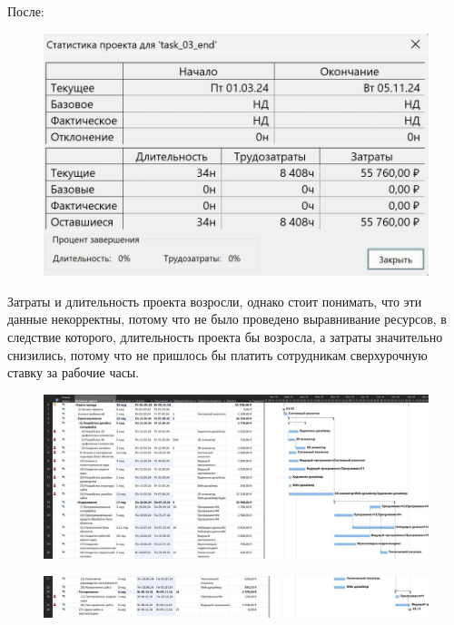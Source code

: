 После:

\begin{figure}[h!]
	\begin{center}
		\includegraphics[scale=0.35]{inc/img/p_16.jpg}
	\end{center}
	\captionsetup{justification=centering}
	\label{fig:u3}
\end{figure}

Затраты и длительность проекта возросли, однако стоит понимать, что эти данные некорректны, потому что не было проведено выравнивание ресурсов, в следствие которого, длительность проекта бы возросла, а затраты значительно снизились, потому что не пришлось бы платить сотрудникам сверхурочную ставку за рабочие часы.

\begin{figure}[h!]
	\begin{center}
		\includegraphics[scale=0.3]{inc/img/p_17.jpg}
	\end{center}
	\captionsetup{justification=centering}
	\label{fig:u3}
\end{figure}


\begin{figure}[h!]
	\begin{center}
		\includegraphics[scale=0.3]{inc/img/p_18.jpg}
	\end{center}
	\captionsetup{justification=centering}
	\label{fig:u3}
\end{figure}

